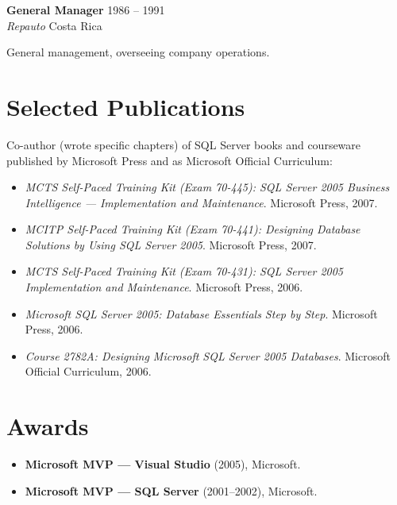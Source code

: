 \documentclass[10.5pt]{article}
\newcommand{\role}[4]{%
  \vspace{4pt}%
  {\bfseries #1} \hfill {\color{muted}\small #4}\\[1pt]%
  {\itshape #2}\,\textperiodcentered\,{\color{muted}#3}\par%
  \vspace{2pt}%
}
\begin{document}
\role{General Manager}{Repauto}{Costa Rica}{1986 -- 1991}
General management, overseeing company operations.

\section{Selected Publications}
Co-author (wrote specific chapters) of SQL Server books and courseware published by Microsoft Press and as Microsoft Official Curriculum:
\begin{itemize}
  \item \textit{MCTS Self-Paced Training Kit (Exam 70-445): SQL Server 2005 Business Intelligence --- Implementation and Maintenance}. Microsoft Press, 2007.
  \item \textit{MCITP Self-Paced Training Kit (Exam 70-441): Designing Database Solutions by Using SQL Server 2005}. Microsoft Press, 2007.
  \item \textit{MCTS Self-Paced Training Kit (Exam 70-431): SQL Server 2005 Implementation and Maintenance}. Microsoft Press, 2006.
  \item \textit{Microsoft SQL Server 2005: Database Essentials Step by Step}. Microsoft Press, 2006.
  \item \textit{Course 2782A: Designing Microsoft SQL Server 2005 Databases}. Microsoft Official Curriculum, 2006.
\end{itemize}

\section{Awards}
\begin{itemize}
  \item \textbf{Microsoft MVP --- Visual Studio} (2005), Microsoft.
  \item \textbf{Microsoft MVP --- SQL Server} (2001--2002), Microsoft.
\end{itemize}

\end{document}
